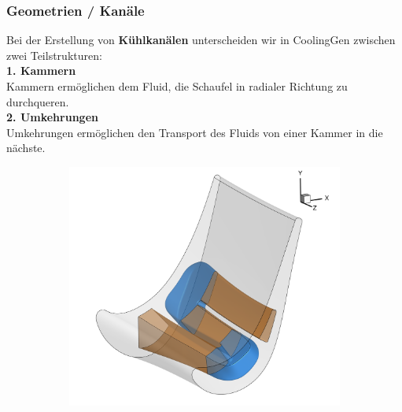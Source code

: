 \documentclass[8pt, aspectratio=169]{beamer}
\begin{document}
\begin{frame}
	\frametitle{Geometrien / Kanäle}
	\vspace{-0.25cm}\hspace{-0.5cm}
	\begin{minipage}[t]{\textwidth}
		Bei der Erstellung von \textbf{Kühlkanälen} unterscheiden wir in CoolingGen zwischen zwei Teilstrukturen:\\[-.8em]

		\textbf{1. Kammern}\\
		Kammern ermöglichen dem Fluid, die Schaufel in radialer Richtung zu durchqueren.\\[-.8em]
		
		\textbf{2. Umkehrungen}\\
		Umkehrungen ermöglichen den Transport des Fluids von einer Kammer in die nächste.\\[-.8em]
	\end{minipage}
	\centering
	\begin{minipage}[t]{.8\textwidth}
		\begin{figure}[H]
			\centering
			\begin{subfigure}{.49\textwidth}
				\includegraphics[width=\textwidth]{../../tec/complete/020.png}
			\end{subfigure}
			\begin{subfigure}{.49\textwidth}
				\centering

\end{subfigure}
\end{figure}
\end{minipage}
\end{frame}
\end{document}
